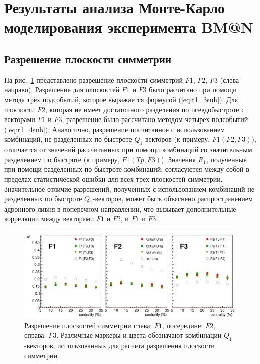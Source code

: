 \section{Результаты анализа Монте-Карло моделирования эксперимента BM@N}

\subsection{Разрешение плоскости симметрии}

На рис.~\ref{fig:bmn_combinations} представлено разрешение плоскости симметрий $F1$, $F2$, $F3$ (слева направо). 
Разрешение для плоскостей $F1$ и $F3$ было расчитано при помощи метода трёх подсобытий, которое выражается формулой (\ref{eq:r1_3sub}).
Для плоскости $F2$, которая не имеет достаточного разделения по псевдобыстроте с векторами $F1$ и $F3$, разрешение было рассчитано методом четырёх подсобытий (\ref{eq:r1_4sub}).
Аналогично, разрешение посчитанное с использованием комбинаций, не разделенных по быстроте $Q_1$-векторов (к примеру, $F1(F2,F3)$), отличается от значений рассчитанных при помощи комбинаций со значительным разделением по быстроте (к примеру, $F1(Tp,F3)$).
Значения $R_1$, полученные при помощи разделенных по быстроте комбинаций, согласуются между собой в пределах статистической ошибки для всех трех плоскостей симметрии. 
Значительное отличие разрешений, полученных с использованием комбинаций не разделенных по быстроте $Q_1$-векторов, может быть объяснено распространением адронного ливня в поперечном направлении, что вызывает дополнительные корреляции между векторами $F1$ и $F2$, и $F1$ и $F3$.
%
\begin{figure}[ht]
\begin{center}
\includegraphics[width=0.95\linewidth]{images/R1_F123_combinations_centrality.png}
\caption{Разрешение плоскостей симметрии слева: $F1$, посередине: $F2$, справа: $F3$. Различные маркеры и цвета обозначают комбинации $Q_1$-векторов, использованных для расчета разрешения плоскости симметрии.}
\label{fig:bmn_combinations}
\end{center}
\end{figure}

